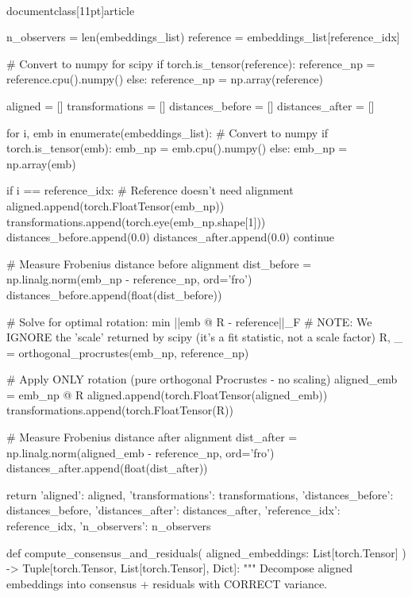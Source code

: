 \\documentclass[11pt]{article}
\begin{document}
\begin{CodeBlock}
    n_observers = len(embeddings_list)
    reference = embeddings_list[reference_idx]
    
    # Convert to numpy for scipy
    if torch.is_tensor(reference):
        reference_np = reference.cpu().numpy()
    else:
        reference_np = np.array(reference)
    
    aligned = []
    transformations = []
    distances_before = []
    distances_after = []
    
    for i, emb in enumerate(embeddings_list):
        # Convert to numpy
        if torch.is_tensor(emb):
            emb_np = emb.cpu().numpy()
        else:
            emb_np = np.array(emb)
        
        if i == reference_idx:
            # Reference doesn't need alignment
            aligned.append(torch.FloatTensor(emb_np))
            transformations.append(torch.eye(emb_np.shape[1]))
            distances_before.append(0.0)
            distances_after.append(0.0)
            continue
        
        # Measure Frobenius distance before alignment
        dist_before = np.linalg.norm(emb_np - reference_np, ord='fro')
        distances_before.append(float(dist_before))
        
        # Solve for optimal rotation: min ||emb @ R - reference||_F
        # NOTE: We IGNORE the 'scale' returned by scipy (it's a fit statistic, not a scale factor)
        R, _ = orthogonal_procrustes(emb_np, reference_np)
        
        # Apply ONLY rotation (pure orthogonal Procrustes - no scaling)
        aligned_emb = emb_np @ R
        aligned.append(torch.FloatTensor(aligned_emb))
        transformations.append(torch.FloatTensor(R))
        
        # Measure Frobenius distance after alignment
        dist_after = np.linalg.norm(aligned_emb - reference_np, ord='fro')
        distances_after.append(float(dist_after))
    
    return {
        'aligned': aligned,
        'transformations': transformations,
        'distances_before': distances_before,
        'distances_after': distances_after,
        'reference_idx': reference_idx,
        'n_observers': n_observers
    }


def compute_consensus_and_residuals(
    aligned_embeddings: List[torch.Tensor]
) -> Tuple[torch.Tensor, List[torch.Tensor], Dict]:
    """
    Decompose aligned embeddings into consensus + residuals with CORRECT variance.
    

\end{CodeBlock}
\end{document}
